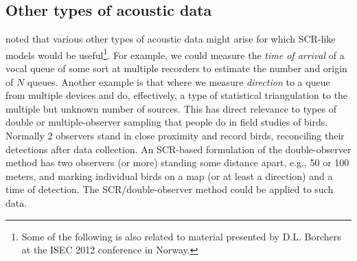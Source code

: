 \subsection{Other types of acoustic data}

\citet{efford_dawson:2010} noted that various other types of acoustic
data might arise for which SCR-like models would be
useful\footnote{Some of the following is also related to material
  presented by D.L. Borchers at the ISEC 2012 conference in Norway.}.
For example, we could measure the {\it time of
  arrival} of a vocal queue of some sort at multiple recorders to
estimate the number and origin of $N$ queues.
Another example is that where we measure {\it direction} to a queue
from multiple devices and do, effectively, a type of statistical
triangulation to the multiple but unknown number of sources.  This has
direct relevance to types of double or multiple-observer sampling that
people do in field studies of birds. Normally 2 observers stand in
close proximity and record birds, reconciling their detections after
data collection. An SCR-based formulation of the double-observer
method has two observers (or more) standing some distance apart, e.g.,
50 or 100 meters,  and marking individual birds on a map (or at
least a direction) and a time of detection.  The SCR/double-observer
method could be applied to such data.



